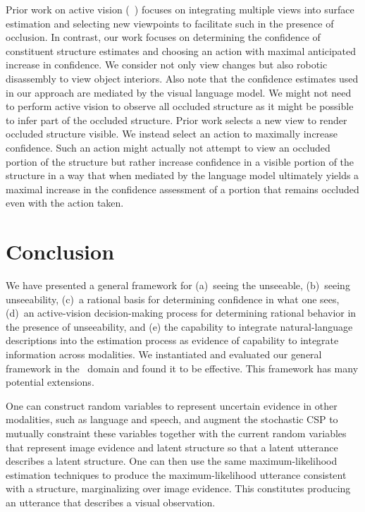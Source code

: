 Prior work on active vision (\eg\ ) focuses on integrating
multiple views into surface estimation and selecting new viewpoints to
facilitate such in the presence of occlusion.
%
In contrast, our work focuses on determining the confidence of constituent
structure estimates and choosing an action with maximal anticipated increase in
confidence.
%
We consider not only view changes but also robotic disassembly to view object
interiors.
%
Also note that the confidence estimates used in our approach are mediated by
the visual language model.
%
We might not need to perform active vision to observe all occluded structure as
it might be possible to infer part of the occluded structure.
%
Prior work selects a new view to render occluded structure visible.
%
We instead select an action to maximally increase confidence.
%
Such an action might actually not attempt to view an occluded portion of the
structure but rather increase confidence in a visible portion of the structure
in a way that when mediated by the language model ultimately yields a maximal
increase in the confidence assessment of a portion that remains occluded even
with the action taken.

\par\vspace{-1ex}
\section{Conclusion}
\label{sec-ll2:conclusion}

We have presented a general framework for (a)~seeing the unseeable, (b)~seeing
unseeability, (c)~a rational basis for determining confidence in what one sees,
(d)~an active-vision decision-making process for determining rational behavior
in the presence of unseeability, and (e) the capability to integrate
natural-language descriptions into the estimation process as evidence of
capability to integrate information across modalities.
%
We instantiated and evaluated our general framework in the
\LincolnLog\ domain and found it to be effective.
%
This framework has many potential extensions.

One can construct random variables to represent uncertain evidence in other
modalities, such as language and speech, and augment the stochastic CSP
to mutually constraint these variables together with the current random
variables that represent image evidence and latent structure so that a latent
utterance describes a latent structure.
%
One can then use the same maximum-likelihood estimation techniques to produce
the maximum-likelihood utterance consistent with a structure, marginalizing
over image evidence.
%
This constitutes producing an utterance that describes a visual observation.

